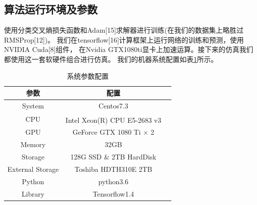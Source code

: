 \subsection{算法运行环境及参数}
使用分类交叉熵损失函数和Adam[15]求解器进行训练(在我们的数据集上略胜过RMSProp[12])。
我们在tensorflow[16]计算框架上运行网络的训练和预测，使用NVIDIA Cuda[8]组件，
在Nvidia GTX1080ti显卡上加速运算。接下来的仿真我们都使用这一套软硬件组合进行仿真。
我们的机器系统配置如表\ref{sec:table_3_1}所示。\par


\begin{table}[H]
	\centering
	\caption{系统参数配置}
	\begin{tabular}{ccc}
		\toprule
		参数 & 配置\\
		\midrule
		System & Centos7.3\\
		\midrule
		CPU & Intel\textsuperscript{\textregistered}  Xeon(R) CPU E5-2683 v3 \\
		\midrule
		GPU & GeForce GTX 1080 Ti $\times$ 2\\
		\midrule 
		Memory & 32GB\\
		\midrule 
		Storage & 128G SSD \& 2TB HardDisk\\
		\midrule
		External Storage & Toshiba HDTH310E 2TB\\
		\midrule 
		Python & python3.6\\
		\midrule 
		Library & Tensorflow1.4\\
		\bottomrule
	\end{tabular}
	\label{sec:table_3_1}  
\end{table}

